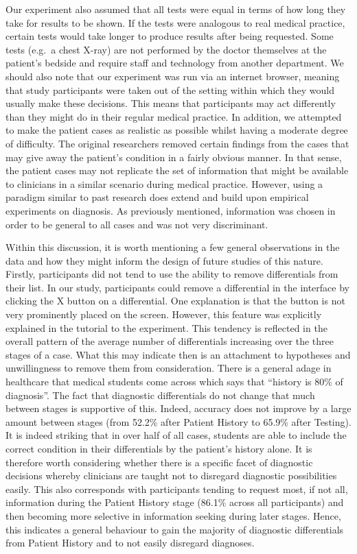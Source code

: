 \documentclass[a4paper, nobind]{templates/ociamthesis}
\begin{document}
Our experiment also assumed that all tests were equal in terms of how long they take for results to be shown. If the tests were analogous to real medical practice, certain tests would take longer to produce results after being requested. Some tests (e.g.~a chest X-ray) are not performed by the doctor themselves at the patient's bedside and require staff and technology from another department. We should also note that our experiment was run via an internet browser, meaning that study participants were taken out of the setting within which they would usually make these decisions. This means that participants may act differently than they might do in their regular medical practice. In addition, we attempted to make the patient cases as realistic as possible whilst having a moderate degree of difficulty. The original researchers removed certain findings from the cases that may give away the patient's condition in a fairly obvious manner. In that sense, the patient cases may not replicate the set of information that might be available to clinicians in a similar scenario during medical practice. However, using a paradigm similar to past research does extend and build upon empirical experiments on diagnosis. As previously mentioned, information was chosen in order to be general to all cases and was not very discriminant.

Within this discussion, it is worth mentioning a few general observations in the data and how they might inform the design of future studies of this nature. Firstly, participants did not tend to use the ability to remove differentials from their list. In our study, participants could remove a differential in the interface by clicking the X button on a differential. One explanation is that the button is not very prominently placed on the screen. However, this feature was explicitly explained in the tutorial to the experiment. This tendency is reflected in the overall pattern of the average number of differentials increasing over the three stages of a case. What this may indicate then is an attachment to hypotheses and unwillingness to remove them from consideration. There is a general adage in healthcare that medical students come across which says that ``history is 80\% of diagnosis''. The fact that diagnostic differentials do not change that much between stages is supportive of this. Indeed, accuracy does not improve by a large amount between stages (from 52.2\% after Patient History to 65.9\% after Testing). It is indeed striking that in over half of all cases, students are able to include the correct condition in their differentials by the patient's history alone. It is therefore worth considering whether there is a specific facet of diagnostic decisions whereby clinicians are taught not to disregard diagnostic possibilities easily. This also corresponds with participants tending to request most, if not all, information during the Patient History stage (86.1\% across all participants) and then becoming more selective in information seeking during later stages. Hence, this indicates a general behaviour to gain the majority of diagnostic differentials from Patient History and to not easily disregard diagnoses.
\end{document}
